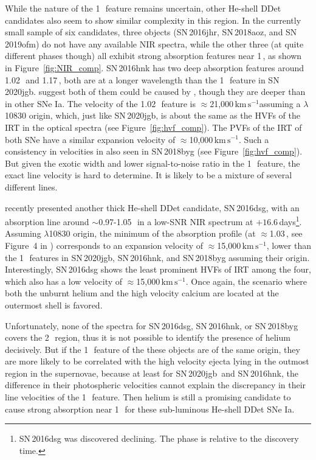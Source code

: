 \documentclass[twocolumn]{aastex631}
\newcommand{\sn}{SN\,2020jgb}
\newcommand{\kms}{$\mathrm{km}\,\mathrm{s}^{-1}$}
\begin{document}
While the nature of the 1\,\micron\ feature remains uncertain, other He-shell DDet candidates also seem to show similar complexity in this region. In the currently small sample of six candidates, three objects (SN\,2016jhr, SN\,2018aoz, and SN\,2019ofm) do not have any available NIR spectra, while the other three (at quite different phases though) all exhibit strong absorption features near 1\,\micron, as shown in Figure~\ref{fig:NIR_comp}. SN\,2016hnk has two deep absorption features around 1.02\,\micron\ and 1.17\,\micron, both are at a longer wavelength than the 1\,\micron\ feature in \sn. \citet{galbany_16hnk_2019} suggest both of them could be caused by , though they are deeper than in other SNe Ia. The velocity of the 1.02\,\micron\ feature is $\approx$21,000\,\kms assuming a  $\lambda$10830 origin, which, just like \sn, is about the same as the HVFs of the  IRT in the optical spectra (see Figure~\ref{fig:hvf_comp}). The PVFs of the  IRT of both SNe have a similar expansion velocity of $\approx$10,000\,\kms. Such a consistency in velocities in also seen in SN\,2018byg (see Figure~\ref{fig:hvf_comp}). But given the exotic width and lower signal-to-noise ratio in the 1\,\micron\ feature, the exact line velocity is hard to determine. It is likely to be a mixture of several different lines. 

\citet{Dong_16dsg_2022} recently presented another thick He-shell DDet candidate, SN\,2016dsg, with an absorption line around $\sim$0.97-1.05\,\micron\ in a low-SNR NIR spectrum at $+16.6$\,days\footnote{SN\,2016dsg was discovered declining. The phase is relative to the discovery time.}. Assuming  $\lambda$10830 origin, the minimum of the absorption profile (at $\approx$1.03\,\micron, see Figure~4 in \citealp{Dong_16dsg_2022}) corresponds to an expansion velocity of $\approx$15,000\,\kms, lower than the 1\,\micron\ features in \sn, SN\,2016hnk, and SN\,2018byg assuming their  origin. Interestingly, SN\,2016dsg shows the least prominent HVFs of  IRT among the four, which also has a low velocity of $\approx$15,000\,\kms. Once again, the scenario where both the unburnt helium and the high velocity calcium are located at the outermost shell is favored.

Unfortunately, none of the spectra for SN\,2016dsg, SN\,2016hnk, or SN\,2018byg covers the 2\,\micron\ region, thus it is not possible to identify the presence of helium decisively. But if the 1\,\micron\ feature of the these objects are of the same origin, they are more likely to be correlated with the high velocity ejecta lying in the outmost region in the supernovae, because at least for \sn\ and SN\,2016hnk, the difference in their photospheric velocities cannot explain the discrepancy in their line velocities of the 1\,\micron\ feature. Then helium is still a promising candidate to cause strong absorption near 1\,\micron\ for these sub-luminous He-shell DDet SNe Ia. 
\end{document}
